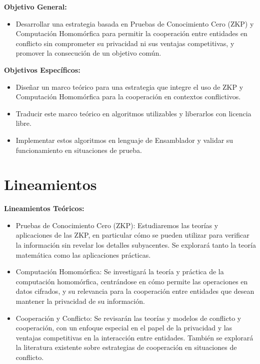 \documentclass[12pt]{article}
\begin{document}
\textbf{Objetivo General:}
\begin{itemize}
    \item{Desarrollar una estrategia basada en Pruebas de Conocimiento Cero (ZKP) y Computación Homomórfica para permitir la cooperación entre entidades en conflicto sin comprometer su privacidad ni sus ventajas competitivas, y promover la consecución de un objetivo común.}
\end{itemize}


\textbf{Objetivos Específicos:}
\begin{itemize}
    \item{Diseñar un marco teórico para una estrategia que integre el uso de ZKP y Computación Homomórfica para la cooperación en contextos conflictivos.} 
    \item{Traducir este marco teórico en algoritmos utilizables y liberarlos con licencia libre.} 
    \item{Implementar estos algoritmos en lenguaje de Ensamblador y validar su funcionamiento en situaciones de prueba.} 
\end{itemize}


\section{Lineamientos}
\textbf{Lineamientos Teóricos:}
\begin{itemize}
    \item{Pruebas de Conocimiento Cero (ZKP): Estudiaremos las teorías y aplicaciones de las ZKP, en particular cómo se pueden utilizar para verificar la información sin revelar los detalles subyacentes. Se explorará tanto la teoría matemática como las aplicaciones prácticas.}
    \item{Computación Homomórfica: Se investigará la teoría y práctica de la computación homomórfica, centrándose en cómo permite las operaciones en datos cifrados, y su relevancia para la cooperación entre entidades que desean mantener la privacidad de su información.}
    \item{Cooperación y Conflicto: Se revisarán las teorías y modelos de conflicto y cooperación, con un enfoque especial en el papel de la privacidad y las ventajas competitivas en la interacción entre entidades. También se explorará la literatura existente sobre estrategias de cooperación en situaciones de conflicto.}
\end{itemize}
\end{document}
